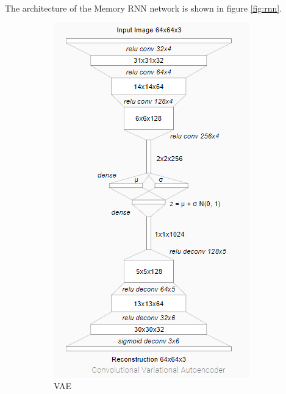 \documentclass{article}
\begin{document}
The architecture of the Memory RNN network is shown in figure \ref{fig:rnn}.

\begin{figure}[!ht]
    \centering
    \begin{subfigure}[b]{.45\textwidth}
        \includegraphics[width=\textwidth]{VAE.png}
        \caption{VAE}
        \label{fig:vae}
    \end{subfigure}
    \begin{subfigure}[b]{.54\textwidth}

\end{subfigure}
\end{figure}
\end{document}
